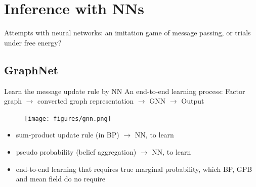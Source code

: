 \documentclass[xcolor=x11names,compress]{beamer}
\begin{document}

\section{Inference with NNs}

{ 
  \begin{frame}
    \begin{center}
      {\large Attempts with neural networks: an imitation game of message passing, or trials under free energy?}
    \end{center}
    
  \end{frame}
}
\subsection{GraphNet}

\begin{frame}{Learn the message update rule by NN}
  An end-to-end learning process: Factor graph $\rightarrow$ converted graph representation $\rightarrow$ GNN $\rightarrow$ Output
  \begin{figure}
    \centerline{\texttt{[image: figures/gnn.png]}}
  \end{figure}
  \begin{itemize}[label=$\bullet$]
  \item sum-product update rule (in BP) $\rightarrow$ NN, to learn
  \item pseudo probability (belief aggregation) $\rightarrow$ NN, to learn
  \item end-to-end learning that requires true marginal probability, which BP, GPB and mean field do no require
  \end{itemize}
  \let\thefootnote\relax{}
\end{frame}
\end{document}
